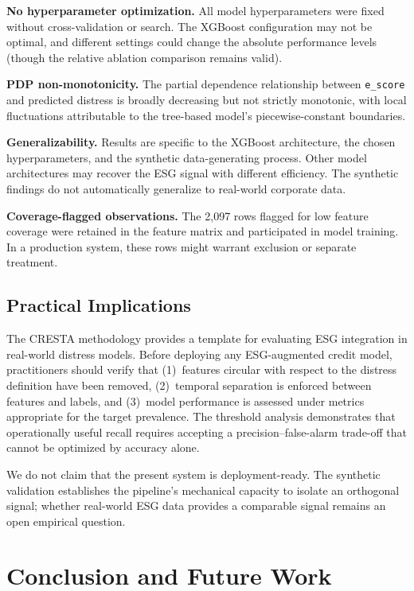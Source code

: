 \documentclass[sigconf,anonymous]{acmart}
\begin{document}
\textbf{No hyperparameter optimization.} All model hyperparameters were fixed without cross-validation or search. The XGBoost configuration may not be optimal, and different settings could change the absolute performance levels (though the relative ablation comparison remains valid).

\textbf{PDP non-monotonicity.} The partial dependence relationship between \texttt{e\_score} and predicted distress is broadly decreasing but not strictly monotonic, with local fluctuations attributable to the tree-based model's piecewise-constant boundaries.

\textbf{Generalizability.} Results are specific to the XGBoost architecture, the chosen hyperparameters, and the synthetic data-generating process. Other model architectures may recover the ESG signal with different efficiency. The synthetic findings do not automatically generalize to real-world corporate data.

\textbf{Coverage-flagged observations.} The 2,097 rows flagged for low feature coverage were retained in the feature matrix and participated in model training. In a production system, these rows might warrant exclusion or separate treatment.

\subsection{Practical Implications}
The CRESTA methodology provides a template for evaluating ESG integration in real-world distress models. Before deploying any ESG-augmented credit model, practitioners should verify that (1)~features circular with respect to the distress definition have been removed, (2)~temporal separation is enforced between features and labels, and (3)~model performance is assessed under metrics appropriate for the target prevalence. The threshold analysis demonstrates that operationally useful recall requires accepting a precision--false-alarm trade-off that cannot be optimized by accuracy alone.

We do not claim that the present system is deployment-ready. The synthetic validation establishes the pipeline's mechanical capacity to isolate an orthogonal signal; whether real-world ESG data provides a comparable signal remains an open empirical question.


\section{Conclusion and Future Work}
\end{document}
